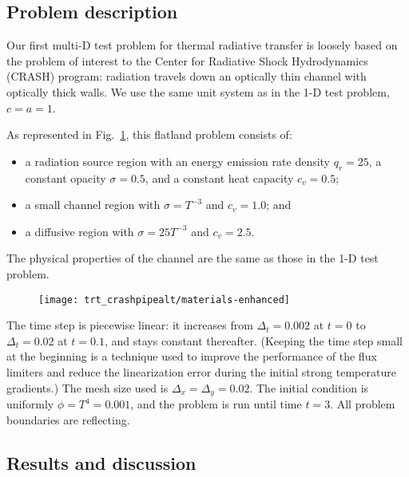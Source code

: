 \subsection{Problem description}

Our first multi-D test problem for thermal radiative transfer is loosely based
on the problem of interest to the Center for Radiative Shock Hydrodynamics
(CRASH) program: radiation travels down an optically thin channel with
optically thick walls. We use the same unit system as in the 1-D test problem, $c=a=1$.

As represented in Fig.~\ref{fig:crashaltMaterials}, this flatland problem
consists of:
\begin{itemize}
  \item a radiation source region with an energy emission rate density $q_r=25$, 
    a constant opacity $\sigma=0.5$, and a constant heat capacity $c_v=0.5$;
  \item a small channel region with $\sigma = T^{-3}$ and $c_v=1.0$; and
  \item a diffusive region with $\sigma = 25 T^{-3}$ and $c_v=2.5$.
\end{itemize}
The physical properties of the channel are the same as those in the 1-D test
problem.

\begin{figure}[htb!]
  \centering
  \texttt{[image: trt\_crashpipealt/materials-enhanced]}
  \label{fig:crashaltMaterials}
\end{figure}

The time step is piecewise linear: it increases from $\Delta_t=0.002$ at $t=0$
to $\Delta_t=0.02$ at $t=0.1$, and stays constant thereafter. (Keeping the
time step small at the beginning is a technique used to improve the
performance of the flux limiters and reduce the linearization error during the
initial strong temperature gradients.) The mesh size used
is $\Delta_x=\Delta_y=0.02$. The initial condition is uniformly $\phi = T^4 = 0.001$, and
the problem is run until time $t=3$. All problem boundaries are reflecting.

\subsection{Results and discussion}

